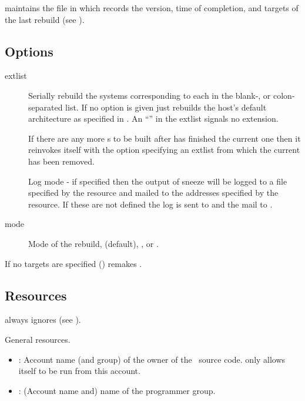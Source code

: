  maintains the  file in  which
records the version, time of completion, and  targets of the
last rebuild (see ).

\subsection*{Options}

\begin{description}
\item[ extlist]
   Serially rebuild the systems corresponding to each  in the
   blank-, or colon-separated list.  If no  option is given
    just rebuilds the host's default architecture as specified in
   .  An ``\code{\_}'' in the extlist signals no extension.

   If there are any more s to be built after  has
   finished the current one then it reinvokes itself with the  option
   specifying an extlist from which the current  has been
   removed.

\item[]
   Log mode - if specified then the output of sneeze will be logged to a file
   specified by the  resource and mailed
   to the addresses specified by the 
   resource.  If these are not defined the log is sent to
    and the mail to .

\item[ mode]
   Mode of the rebuild,  (default), , or
   .
\end{description}

If no targets are specified ()  remakes
.

\subsection*{Resources}

 always ignores  (see ).

\noindent
General resources.

\begin{itemize}
\item
   : Account name (and group) of the owner of the
   \aipspp\ source code.   only allows itself to be run from this
   account.

\item
   : (Account name and) name of the \aipspp
   programmer group.
\end{itemize}

